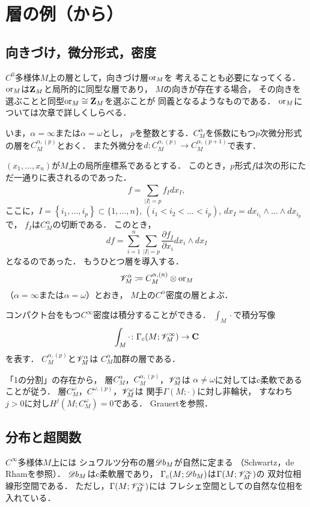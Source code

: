 \section{層の例（{\cite[\S2.9]{KS90}}から）}

\subsection{向きづけ，微分形式，密度}
\(C^0\)多様体\(M\)上の層として，向きづけ層\(\mathord{\mathrm{or}} _M\)を
考えることも必要になってくる．
\(\mathord{\mathrm{or}}_M\)は\(\mathbf{Z}_M\)と局所的に同型な層であり，
\(M\)の向きが存在する場合，
その向きを選ぶことと同型\(\mathord{\mathrm{or}}_M\cong\mathbf{Z}_M\)を選ぶことが
同義となるようなものである．
\(\mathord{\mathrm{or}}_M\)については次章で詳しくしらべる．

いま，\(\alpha=\infty\)または\(\alpha=\omega\)とし，
\(p\)を整数とする．\(C^\alpha_M\)を係数にもつ\(p\)次微分形式
の層を\(C_M^{\alpha,(p)}\)とおく．
また外微分を\(
    d\colon C_M^{\alpha,(p)}\to C_M^{\alpha,(p+1)}
\)で表す．

\((x_1,\dots,x_n)\)が\(M\)上の局所座標系であるとする．
このとき，\(p\)形式\(f\)は次の形にただ一通りに表されるのであった．
\[
    f=\sum_{\lvert I\rvert=p}^{}f_Idx_I,
\]ここに，\(
    I=\left\{i_1,\dots,i_p\right\}\subset\{1,\dots,n\}
\), \((i_1<i_2<\dots<i_p)\), 
\(dx_I=dx_{i_1}\wedge\dots\wedge dx_{i_p}\)で，
\(f_I\)は\(C^\alpha_M\)の切断である．
このとき，\[
    df=\sum_{i=1}^{n}\sum_{\lvert I\rvert=p}^{}\frac{\partial f_I}{\partial x_i}dx_i\wedge dx_I
\]となるのであった．
もうひとつ層を導入する．
\[
    \mathscr{V}_M^\alpha
    \coloneqq
    C^{\alpha,(n)}_M\otimes\mathord{\mathrm{or}}_M
\]（\(\alpha=\infty\)または\(\alpha=\omega\)）とおき，
\(M\)上の\(C^\alpha\)密度の層とよぶ．

コンパクト台をもつ\(C^\infty\)密度は積分することができる．
\(\int_M\cdot\)で積分写像
\begin{equation}
    \int_M\cdot\colon\Gamma_c(M;\mathscr{V}_M^\infty)\to\mathbf{C} \label{eq:int}
\end{equation}を表す．
\(C^{\alpha,(p)}_M\)と\(\mathscr{V}_M^\alpha\)は
\(C^\alpha_M\)加群の層である．

「1の分割」の存在から，
層\(C^\alpha_M\)，\(C_M^{\alpha,(p)}\)，\(\mathscr{V}_M^\alpha\)は
\(\alpha\neq\omega\)に対してはc柔軟であることが従う．
層\(C^\omega_M\)，\(C^{\omega,(p)}\)，\(\mathscr{V}_M^\omega\)は
関手\(\Gamma(M;\cdot)\)に対し非輪状，
すなわち\(j>0\)に対し\(H^j(M;C^\omega_M)=0\)である．
Grauert\cite{G58}を参照．

\subsection{分布と超関数}
\(C^\infty\)多様体\(M\)上には
シュワルツ分布の層\(\mathord{\mathscr{D}b}_M\)が自然に定まる
（Schwartz\cite{S66}，de Rham\cite{R55}を参照）．
\(\mathord{\mathscr{D}b}_M\)はc柔軟層であり，
\(\Gamma_c(M;\mathord{\mathscr{D}b}_M)\)は\(\Gamma(M;\mathscr{V}_M^\infty)\)の
双対位相線形空間である．
ただし，\(\Gamma(M;\mathscr{V}_M^\infty)\)には
フレシェ空間としての自然な位相を入れている．

